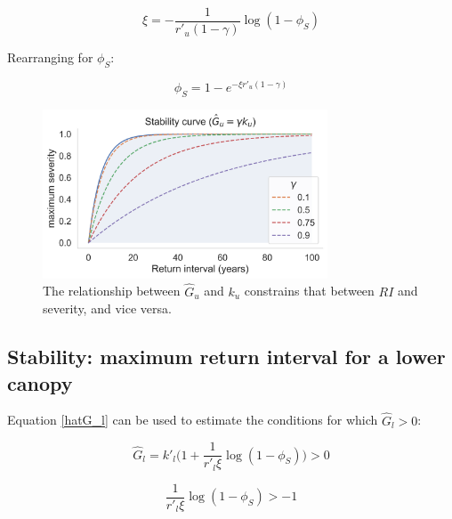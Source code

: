 \documentclass{article}
\begin{document}
        \begin{equation}
        \xi = -\frac{1}{r'_u (1-\gamma) }\log(1-\phi_S)
        \end{equation}
        
        Rearranging for $\phi_S$:
        
        
        \begin{equation}
        \phi_S = 1- e^{-\xi r'_u (1-\gamma)}
        \label{max_severity}
        \end{equation}
        
        
 \begin{figure}[h]
 \centering
\includegraphics[width=20pc]{../fire_plots/stability.png}
 \caption{ The relationship between $\hat G_u$ and $k_u$ constrains that between $RI$ and severity, and vice versa.}
 \label{fig:stability}
 \end{figure}
   
   
\subsection{Stability: maximum return interval for a lower canopy}


Equation \ref{hatG_l} can be used to estimate the conditions for which $\hat G_l >0$:

\begin{equation}
\hat{G}_l =
 		k'_l \big( 1 + \frac{1}{r'_l \xi} \log(1-\phi_S) \big) > 0
\end{equation}


\begin{equation}
 		\frac{1}{r'_l \xi} \log(1-\phi_S) > -1
\end{equation}
\end{document}
